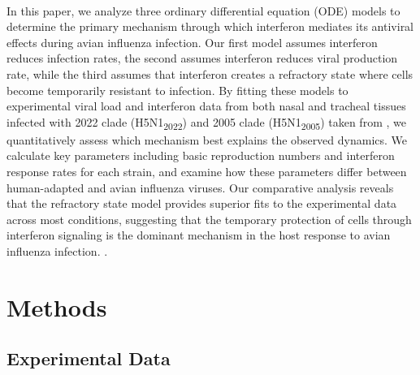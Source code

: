 \documentclass[12pt]{article}
\begin{document}
\noindent \\ In this paper, we analyze three ordinary differential equation (ODE) models to determine the primary mechanism through which interferon mediates its antiviral effects during avian influenza infection. Our first model assumes interferon reduces infection rates, the second assumes interferon reduces viral production rate, while the third assumes that interferon creates a refractory state where cells become temporarily resistant to infection. By fitting these models to experimental viral load and interferon data from both nasal and tracheal tissues infected with 2022 clade (H5N1\textsubscript{2022}) and 2005 clade (H5N1\textsubscript{2005}) taken from \cite{bauer24}, we quantitatively assess which mechanism best explains the observed dynamics. We calculate key parameters including basic reproduction numbers and interferon response rates for each strain, and examine how these parameters differ between human-adapted and avian influenza viruses. Our comparative analysis reveals that the refractory state model provides superior fits to the experimental data across most conditions, suggesting that the temporary protection of cells through interferon signaling is the dominant mechanism in the host response to avian influenza infection. .

\section{Methods}
\subsection{Experimental Data}
\end{document}

